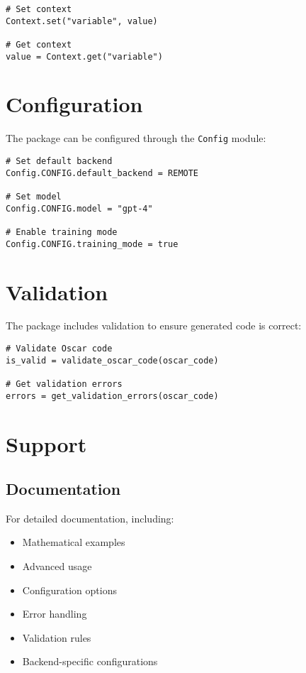 \documentclass[11pt,a4paper]{article}
\newcommand{\modname}[1]{\texttt{#1}}
\begin{document}
\begin{lstlisting}
# Set context
Context.set("variable", value)

# Get context
value = Context.get("variable")
\end{lstlisting}

\section{Configuration}

The package can be configured through the \modname{Config} module:

\begin{lstlisting}
# Set default backend
Config.CONFIG.default_backend = REMOTE

# Set model
Config.CONFIG.model = "gpt-4"

# Enable training mode
Config.CONFIG.training_mode = true
\end{lstlisting}

\section{Validation}

The package includes validation to ensure generated code is correct:

\begin{lstlisting}
# Validate Oscar code
is_valid = validate_oscar_code(oscar_code)

# Get validation errors
errors = get_validation_errors(oscar_code)
\end{lstlisting}

\section{Support}
\label{sec:support}

\subsection{Documentation}
For detailed documentation, including:
\begin{itemize}
    \item Mathematical examples
    \item Advanced usage
    \item Configuration options
    \item Error handling
    \item Validation rules
    \item Backend-specific configurations
\end{itemize}
\end{document}
